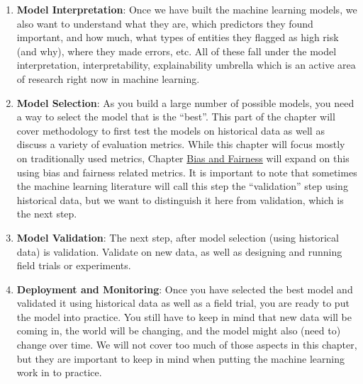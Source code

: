 \documentclass[]{krantz}
\begin{document}
\begin{enumerate}
  method makes a difference assumption about the structure and
  distribution of the data and with large amounts of high-dimensional
  data\footnote{Dimensionality of the data often refers to how many
    variables we have in the data.}, it is difficult to know apriori
  which assumption will best match the data we have. Typically, in
  machine learning, you take a collection of methods and try them out to
  empirically validate which one works the best for your problem. This
  process not only helps you select the best method for your problem but
  also helps you understand the structure of your data. We will give an
  overview of leading methods that are being used today in this chapter.
\item
  \textbf{Model Interpretation}: Once we have built the machine learning
  models, we also want to understand what they are, which predictors
  they found important, and how much, what types of entities they
  flagged as high risk (and why), where they made errors, etc. All of
  these fall under the model interpretation, interpretability,
  explainability umbrella which is an active area of research right now
  in machine learning.
\item
  \textbf{Model Selection}: As you build a large number of possible
  models, you need a way to select the model that is the ``best''. This
  part of the chapter will cover methodology to first test the models on
  historical data as well as discuss a variety of evaluation metrics.
  While this chapter will focus mostly on traditionally used metrics,
  Chapter \protect\hyperlink{chap:bias}{Bias and Fairness} will expand
  on this using bias and fairness related metrics. It is important to
  note that sometimes the machine learning literature will call this
  step the ``validation'' step using historical data, but we want to
  distinguish it here from validation, which is the next step.
\item
  \textbf{Model Validation}: The next step, after model selection (using
  historical data) is validation. Validate on new data, as well as
  designing and running field trials or experiments.
\item
  \textbf{Deployment and Monitoring}: Once you have selected the best
  model and validated it using historical data as well as a field trial,
  you are ready to put the model into practice. You still have to keep
  in mind that new data will be coming in, the world will be changing,
  and the model might also (need to) change over time. We will not cover
  too much of those aspects in this chapter, but they are important to
  keep in mind when putting the machine learning work in to practice.
\end{enumerate}
\end{document}
